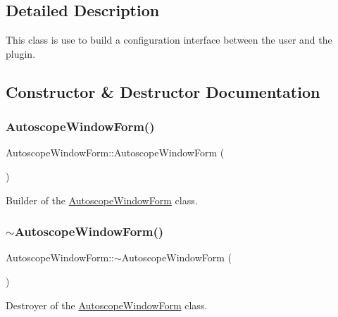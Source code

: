\subsection{Detailed Description}
This class is use to build a configuration interface between the user and the plugin. 

\subsection{Constructor \& Destructor Documentation}
\mbox{\label{class_autoscope_window_form_abff392139c212a6f9e183d3984a02a47}} 
\subsubsection{\texorpdfstring{AutoscopeWindowForm()}{AutoscopeWindowForm()}}
{\footnotesize\ttfamily Autoscope\+Window\+Form\+::\+Autoscope\+Window\+Form (\begin{DoxyParamCaption}{ }\end{DoxyParamCaption})}



Builder of the \mbox{\hyperlink{class_autoscope_window_form}{Autoscope\+Window\+Form}} class. 

\mbox{\label{class_autoscope_window_form_a2a7cceef655815a6c6ee1cc65a40fa8d}} 
\subsubsection{\texorpdfstring{$\sim$AutoscopeWindowForm()}{~AutoscopeWindowForm()}}
{\footnotesize\ttfamily Autoscope\+Window\+Form\+::$\sim$\+Autoscope\+Window\+Form (\begin{DoxyParamCaption}{ }\end{DoxyParamCaption})}



Destroyer of the \mbox{\hyperlink{class_autoscope_window_form}{Autoscope\+Window\+Form}} class. 



